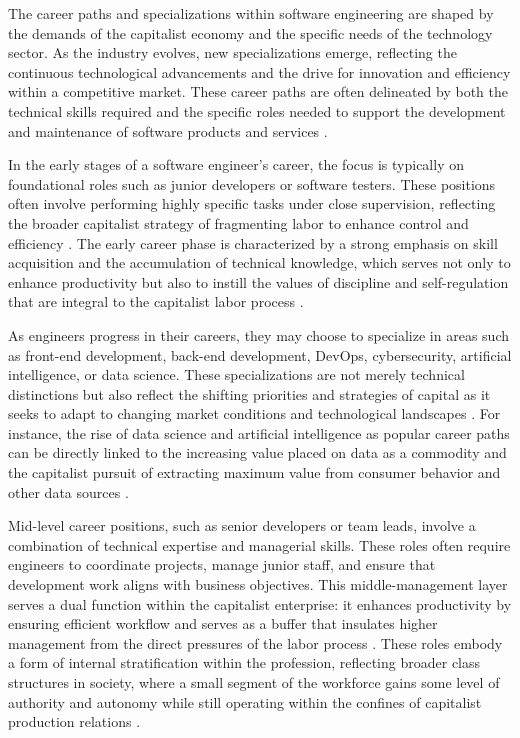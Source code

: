 \begin{refsection}
The career paths and specializations within software engineering are shaped by the demands of the capitalist economy and the specific needs of the technology sector. As the industry evolves, new specializations emerge, reflecting the continuous technological advancements and the drive for innovation and efficiency within a competitive market. These career paths are often delineated by both the technical skills required and the specific roles needed to support the development and maintenance of software products and services \cite[pp.~35-39]{braverman1974labor}.

In the early stages of a software engineer's career, the focus is typically on foundational roles such as junior developers or software testers. These positions often involve performing highly specific tasks under close supervision, reflecting the broader capitalist strategy of fragmenting labor to enhance control and efficiency \cite[pp.~284-287]{marx2008capital}. The early career phase is characterized by a strong emphasis on skill acquisition and the accumulation of technical knowledge, which serves not only to enhance productivity but also to instill the values of discipline and self-regulation that are integral to the capitalist labor process \cite[pp.~65-68]{braverman1974labor}.

As engineers progress in their careers, they may choose to specialize in areas such as front-end development, back-end development, DevOps, cybersecurity, artificial intelligence, or data science. These specializations are not merely technical distinctions but also reflect the shifting priorities and strategies of capital as it seeks to adapt to changing market conditions and technological landscapes \cite[pp.~415-418]{marx2008capital}. For instance, the rise of data science and artificial intelligence as popular career paths can be directly linked to the increasing value placed on data as a commodity and the capitalist pursuit of extracting maximum value from consumer behavior and other data sources \cite[pp.~96-99]{engels1987condition}.

Mid-level career positions, such as senior developers or team leads, involve a combination of technical expertise and managerial skills. These roles often require engineers to coordinate projects, manage junior staff, and ensure that development work aligns with business objectives. This middle-management layer serves a dual function within the capitalist enterprise: it enhances productivity by ensuring efficient workflow and serves as a buffer that insulates higher management from the direct pressures of the labor process \cite[pp.~142-145]{braverman1974labor}. These roles embody a form of internal stratification within the profession, reflecting broader class structures in society, where a small segment of the workforce gains some level of authority and autonomy while still operating within the confines of capitalist production relations \cite[pp.~482-485]{marx2008capital}.


\end{refsection}
